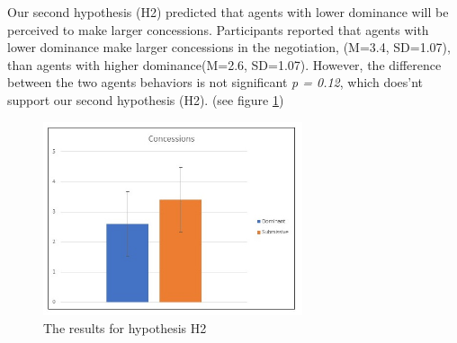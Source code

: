 \documentclass{llncs}
\begin{document}
		\par Our second hypothesis (H2) predicted that agents with lower dominance will be perceived to make larger concessions. Participants reported that agents with lower dominance  make larger concessions in the negotiation, (M=3.4, SD=1.07), than agents with higher dominance(M=2.6, SD=1.07). However, the difference between the two agents behaviors is not significant \emph{p = 0.12}, which does'nt support our second hypothesis (H2). (see figure  \ref{concession})
		
			\begin{figure}[h]
				\centering
				\caption{\label{concession} The results for hypothesis H2}
				\includegraphics[width=3in]{plots/conced}
			\end{figure}
		
\end{document}
